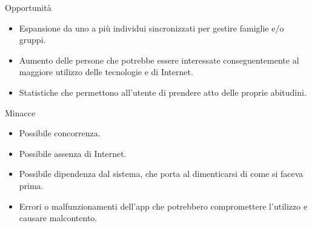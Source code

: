 \documentclass[a4paper,12pt]{article}
\begin{document}
{\sffamily  Opportunità}
\begin{itemize} \setlength\itemsep{0.01em}

\item Espansione da uno a più individui sincronizzati per gestire famiglie e/o gruppi.
\item Aumento delle persone che potrebbe essere interessate conseguentemente al maggiore utilizzo delle tecnologie e di Internet.
\item Statistiche che permettono all'utente di prendere atto delle proprie abitudini.
\end{itemize}

{\sffamily  Minacce}
\begin{itemize} \setlength\itemsep{0.01em}

\item Possibile concorrenza.
\item Possibile assenza di Internet.
\item Possibile dipendenza dal sistema, che porta al dimenticarsi di come si faceva prima.
\item Errori o malfunzionamenti dell'app che potrebbero compromettere l'utilizzo e causare malcontento.
\end{itemize}
\end{document}

